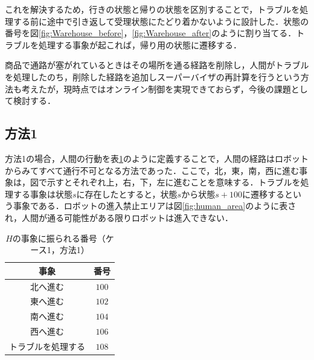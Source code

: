 これを解決するため，行きの状態と帰りの状態を区別することで，トラブルを処理する前に途中で引き返して受理状態にたどり着かないように設計した．状態の番号を図\ref{fig:Warehouse_before}，\ref{fig:Warehouse_after}のように割り当てる．トラブルを処理する事象が起これば，帰り用の状態に遷移する．

商品で通路が塞がれているときはその場所を通る経路を削除し，人間がトラブルを処理したのち，削除した経路を追加しスーパーバイザの再計算を行うという方法も考えたが，現時点ではオンライン制御を実現できておらず，今後の課題として検討する．

\subsection{方法1} \label{sec:case1_method1}
方法1の場合，人間の行動を表\ref{tb:event_numbers_human1}のように定義することで，人間の経路はロボットからみてすべて通行不可となる方法であった．ここで，北，東，南，西に進む事象は，図で示すとそれぞれ上，右，下，左に進むことを意味する．トラブルを処理する事象は状態$s$に存在したとすると，状態$s$から状態$s+100$に遷移するという事象である．ロボットの進入禁止エリアは図\ref{fig:human_area}のように表され，人間が通る可能性がある限りロボットは進入できない．

\begin{table}[htb]
    \centering
    \begin{tabular}{|c|c|} \hline
        事象 & 番号 \\ \hline
        北へ進む & $100$ \\
        東へ進む & $102$ \\
        南へ進む & $104$ \\
        西へ進む & $106$ \\ 
        トラブルを処理する & $108$ \\ \hline
    \end{tabular}
    \caption{$H$の事象に振られる番号（ケース1，方法1）}
    \label{tb:event_numbers_human1}
\end{table}

